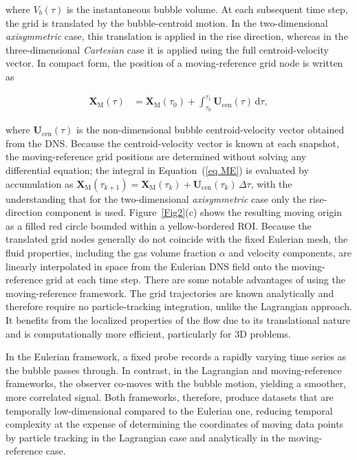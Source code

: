 \documentclass[a4paper,fleqn]{cas-sc}
\begin{document}
	\noindent where $V_b(\tau)$ is the instantaneous bubble volume. At each subsequent time step, the grid is translated by the bubble-centroid motion. In the two-dimensional \textit{axisymmetric} case, this translation is applied in the rise direction, whereas in the three-dimensional \textit{Cartesian} case it is applied using the full centroid-velocity vector. In compact form, the position of a moving-reference grid node is written as
	
	\begin{align}
		\mathbf{X}_{\mathrm{M}}(\tau) &= \mathbf{X}_{\mathrm{M}}(\tau_0) + \int_{\tau_0}^{\tau_1} \mathbf{U}_{\mathrm{cen}}(\tau)\,\mathrm{d}\tau,
		\label{eq ME}
	\end{align}
	
	\noindent where $\mathbf{U}_{\mathrm{cen}}(\tau)$ is the non-dimensional bubble centroid-velocity vector obtained from the DNS. Because the centroid-velocity vector is known at each snapshot, the moving-reference grid positions are determined without solving any differential equation; the integral in Equation~(\ref{eq ME}) is evaluated by accumulation as $\mathbf{X}_{\mathrm{M}}(\tau_{k+1}) = \mathbf{X}_{\mathrm{M}}(\tau_k) + \mathbf{U}_{\mathrm{cen}}(\tau_k)\,\Delta\tau$, with the understanding that for the two-dimensional \textit{axisymmetric} case only the rise-direction component is used. Figure~\ref{Fig2}(c) shows the resulting moving origin as a filled red circle bounded within a yellow-bordered ROI. Because the translated grid nodes generally do not coincide with the fixed Eulerian mesh, the fluid properties, including the gas volume fraction $\alpha$ and velocity components, are linearly interpolated in space from the Eulerian DNS field onto the moving-reference grid at each time step. There are some notable advantages of using the moving-reference framework. The grid trajectories are known analytically and therefore require no particle-tracking integration, unlike the Lagrangian approach. It benefits from the localized properties of the flow due to its translational nature and is computationally more efficient, particularly for 3D problems.
	
	In the Eulerian framework, a fixed probe records a rapidly varying time series as the bubble passes through. In contrast, in the Lagrangian and moving-reference frameworks, the observer co-moves with the bubble motion, yielding a smoother, more correlated signal. Both frameworks, therefore, produce datasets that are temporally low-dimensional compared to the Eulerian one, reducing temporal complexity at the expense of determining the coordinates of moving data points by particle tracking in the Lagrangian case and analytically in the moving-reference case.
	
\end{document}

